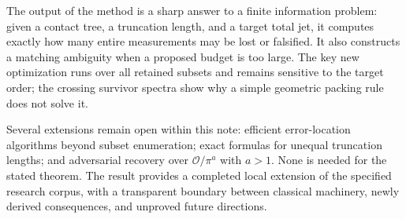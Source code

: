\documentclass[11pt]{article}
\theoremstyle{definition}
\begin{document}
The output of the method is a sharp answer to a finite information problem: given a contact tree, a truncation length, and a target total jet, it computes exactly how many entire measurements may be lost or falsified. It also constructs a matching ambiguity when a proposed budget is too large. The key new optimization runs over all retained subsets and remains sensitive to the target order; the crossing survivor spectra show why a simple geometric packing rule does not solve it.

Several extensions remain open within this note: efficient error-location algorithms beyond subset enumeration; exact formulas for unequal truncation lengths; and adversarial recovery over $\mathcal O/\pi^a$ with $a>1$. None is needed for the stated theorem. The result provides a completed local extension of the specified research corpus, with a transparent boundary between classical machinery, newly derived consequences, and unproved future directions.
\end{document}
